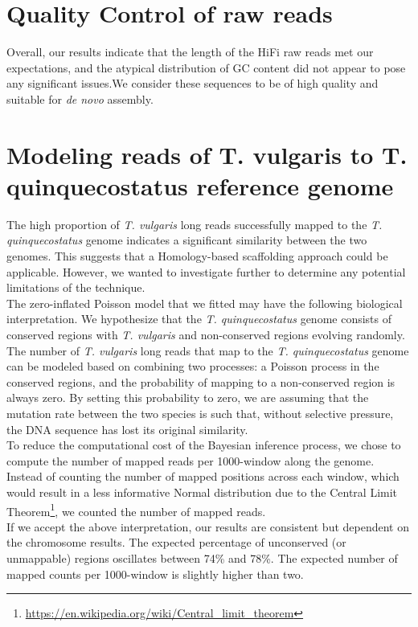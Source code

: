 \section{Quality Control of raw reads}

Overall, our results indicate that the length of the \ac{HiFi} raw reads met our expectations, and the atypical distribution of GC content did not appear to pose any significant issues.We consider these sequences to be of high quality and suitable for \textit{de novo} assembly. 

\section{Modeling reads of T. vulgaris to T. quinquecostatus reference genome}


The high proportion of \textit{T. vulgaris} long reads successfully mapped to the \textit{T. quinquecostatus} genome indicates a significant similarity between the two genomes. This suggests that a Homology-based scaffolding approach could be applicable. However, we wanted to investigate further to determine any potential limitations of the technique.\\


The zero-inflated Poisson model that we fitted may have the following biological interpretation. We hypothesize that the \textit{T. quinquecostatus} genome consists of conserved regions with \textit{T. vulgaris} and non-conserved regions evolving randomly. The number of \textit{T. vulgaris} long reads that map to the \textit{T. quinquecostatus} genome can be modeled based on combining two processes: a Poisson process in the conserved regions, and the probability of mapping to a non-conserved region is always zero. By setting this probability to zero, we are assuming that the mutation rate between the two species is such that, without selective pressure, the DNA sequence has lost its original similarity. \\

To reduce the computational cost of the Bayesian inference process, we chose to compute the number of mapped reads per 1000-window along the genome. Instead of counting the number of mapped positions across each window, which would result in a less informative Normal distribution due to the Central Limit Theorem\footnote{\url{https://en.wikipedia.org/wiki/Central_limit_theorem}}, we counted the number of mapped reads.\\

If we accept the above interpretation,  our results are consistent but dependent on the chromosome results. The expected percentage of unconserved (or unmappable) regions oscillates between 74\% and 78\%. The expected number of mapped counts per 1000-window is slightly higher than two.\\

